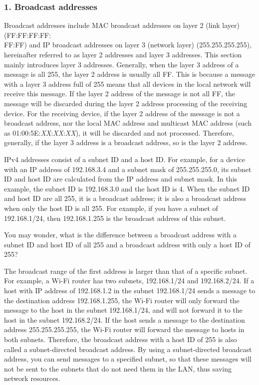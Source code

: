 \documentclass[a4paper,12pt,openany]{book}
\begin{document}
\subsubsection{1. Broadcast addresses}
Broadcast addresses include MAC broadcast addresses on layer 2 (link layer) (FF:FF:FF:FF:\\FF:FF) and IP broadcast addresses on layer 3 (network layer) (255.255.255.255), hereinafter referred to as layer 2 addresses and layer 3 addresses. This section mainly introduces layer 3 addresses. Generally, when the layer 3 address of a message is all 255, the layer 2 address is usually all FF. This is because a message with a layer 3 address full of 255 means that all devices in the local network will receive this message. If the layer 2 address of the message is not all FF, the message will be discarded during the layer 2 address processing of the receiving device. For the receiving device, if the layer 2 address of the message is not a broadcast address, nor the local MAC address and multicast MAC address (such as 01:00:5E:\textit{XX}:\textit{XX}:\textit{XX}), it will be discarded and not processed. Therefore, generally, if the layer 3 address is a broadcast address, so is the layer 2 address.

IPv4 addresses consist of a subnet ID and a host ID. For example, for a device with an IP address of 192.168.3.4 and a subnet mask of 255.255.255.0, its subnet ID and host ID are calculated from the IP address and subnet mask. In this example, the subnet ID is 192.168.3.0 and the host ID is 4. When the subnet ID and host ID are all 255, it is a broadcast address; it is also a broadcast address when only the host ID is all 255. For example, if you have a subnet of 192.168.1/24, then 192.168.1.255 is the broadcast address of this subnet.

You may wonder, what is the difference between a broadcast address with a subnet ID and host ID of all 255 and a broadcast address with only a host ID of 255?

The broadcast range of the first address is larger than that of a specific subnet. For example, a Wi-Fi router has two subnets, 192.168.1/24 and 192.168.2/24. If a host with IP address of 192.168.1.2 in the subnet 192.168.1/24 sends a message to the destination address 192.168.1.255, the Wi-Fi router will only forward the message to the host in the subnet 192.168.1/24, and will not forward it to the host in the subnet 192.168.2/24. If the host sends a message to the destination address 255.255.255.255, the Wi-Fi router will forward the message to hosts in both subnets. Therefore, the broadcast address with a host ID of 255 is also called a subnet-directed broadcast address. By using a subnet-directed broadcast address, you can send messages to a specified subnet, so that these messages will not be sent to the subnets that do not need them in the LAN, thus saving network resources.
\end{document}

